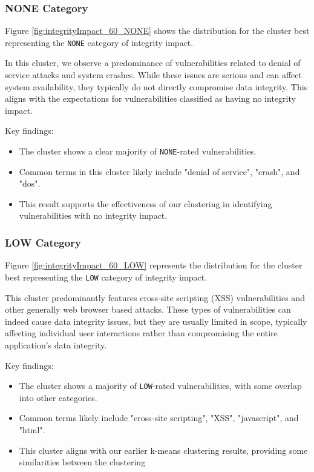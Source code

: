 \documentclass[12pt]{article}
\begin{document}
\subsubsection*{NONE Category}

Figure \ref{fig:integrityImpact_60_NONE} shows the distribution for the cluster best representing
the \texttt{NONE} category of integrity impact.


In this cluster, we observe a predominance of vulnerabilities related to denial of service attacks
and system crashes. While these issues are serious and can affect system availability, they
typically do not directly compromise data integrity. This aligns with the expectations for
vulnerabilities classified as having no integrity impact.

Key findings:
\begin{itemize}

	\item The cluster shows a clear majority of \texttt{NONE}-rated vulnerabilities.

	\item Common terms in this cluster likely include "denial of service", "crash", and
	      "dos".

	\item This result supports the effectiveness of our clustering in identifying vulnerabilities
	      with no integrity impact.

\end{itemize}

\subsubsection*{LOW Category}

Figure \ref{fig:integrityImpact_60_LOW} represents the distribution for the cluster best representing the \texttt{LOW} category of integrity impact.


This cluster predominantly features cross-site scripting (XSS) vulnerabilities and other generally
web browser based attacks. These types of vulnerabilities can indeed cause data integrity issues, but
they are usually limited in scope, typically affecting individual user interactions rather than
compromising the entire application's data integrity.

Key findings:
\begin{itemize}

	\item The cluster shows a majority of \texttt{LOW}-rated vulnerabilities, with some overlap into
	      other categories.

	\item Common terms likely include "cross-site scripting", "XSS", "javascript", and "html".

	\item This cluster aligns with our earlier k-means clustering results, providing some
	      similarities between the clustering
\end{itemize}
\end{document}
